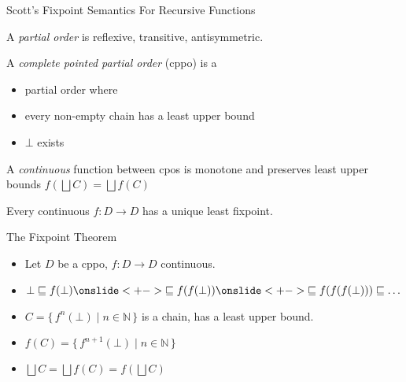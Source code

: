 \documentclass{beamer}
\newcommand{\below}{\sqsubseteq}
\newcommand{\set}[1]{\{\,#1\,\}}
\newcommand{\bbN}{\mathbb{N}}
\newcommand{\lub}{\bigsqcup}
\newcommand{\arr}{\rightarrow}
\begin{document}
\begin{frame}{Scott's Fixpoint Semantics For Recursive Functions}

\begin{definition}
A \emph{partial order} is reflexive, transitive, antisymmetric.
\end{definition}

\begin{definition}
A \emph{complete pointed partial order} (cppo) is a
\begin{itemize}
\item partial order where
\item every non-empty chain has a least upper bound
\item $\bot$ exists
\end{itemize}
\end{definition}

\begin{definition}
A \emph{continuous} function between cpos is monotone and preserves least upper bounds $f(\lub C) = \lub f(C)$
\end{definition}

\begin{theorem}
Every continuous $f : D \arr D$ has a unique least fixpoint.
\end{theorem}

\end{frame}



\begin{frame}{The Fixpoint Theorem}

\begin{itemize} \itemsep0.5em
\onslide<+->
\item Let $D$ be a cppo, $f : D \arr D$ continuous.

\item $\bot \below f(\bot)
   \onslide<+->{ \below f(f(\bot))}
   \onslide<+->{\below f(f(f(\bot))) \below \ldots}$

\onslide<+->
\item $C = \set{f^n(\bot) \mid n \in \bbN}$ is a chain, has a least upper bound.

\onslide<+->
\item $f(C) = \set{f^{n+1}(\bot) \mid n \in \bbN}$

\onslide<+->
\item $\lub C = \lub f(C) = f(\lub C)$

\end{itemize}

\end{frame}
\end{document}
